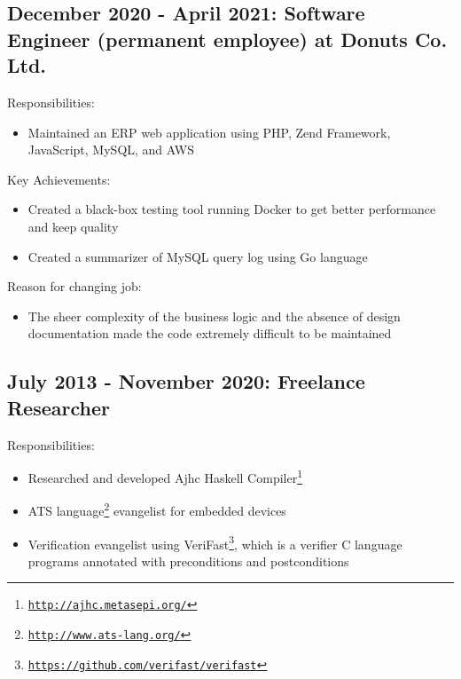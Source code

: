 \documentclass[letterpaper]{article}
\begin{document}
\subsection*{December 2020 - April 2021: Software Engineer (permanent employee) at Donuts Co. Ltd.}

\noindent Responsibilities:

\begin{itemize}
  \item Maintained an ERP web application using PHP, Zend Framework, JavaScript, MySQL, and AWS
\end{itemize}

\noindent Key Achievements:

\begin{itemize}
  \item Created a black-box testing tool running Docker to get better performance and keep quality
  \item Created a summarizer of MySQL query log using Go language
\end{itemize}

\noindent Reason for changing job:

\begin{itemize}
  \item The sheer complexity of the business logic and the absence of design documentation made the code extremely difficult to be maintained
\end{itemize}

\subsection*{July 2013 - November 2020: Freelance Researcher}

\noindent Responsibilities:

\begin{itemize}
  \item Researched and developed Ajhc Haskell Compiler\footnote{\href{http://ajhc.metasepi.org/}{\tt http://ajhc.metasepi.org/}}
  \item ATS language\footnote{\href{http://www.ats-lang.org/}{\tt http://www.ats-lang.org/}} evangelist for embedded devices
  \item Verification evangelist using VeriFast\footnote{\href{https://github.com/verifast/verifast}{\tt https://github.com/verifast/verifast}}, which is a verifier C language programs annotated with preconditions and postconditions
\end{itemize}
\end{document}

